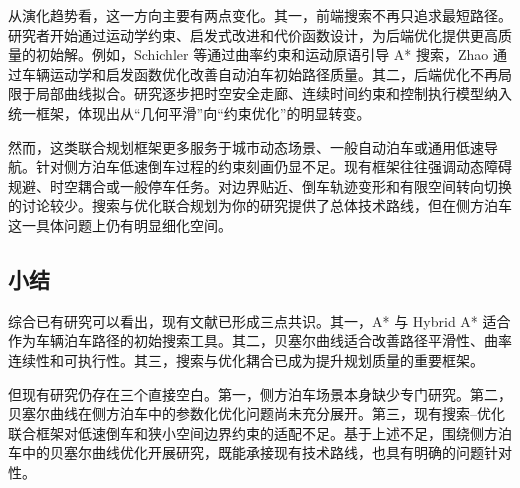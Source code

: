 从演化趋势看，这一方向主要有两点变化。其一，前端搜索不再只追求最短路径。研究者开始通过运动学约束、启发式改进和代价函数设计，为后端优化提供更高质量的初始解\cite{zhao2024automatedparkingbev,schichler2024smoothastar,li2025hybridastarjoint}。例如，Schichler 等通过曲率约束和运动原语引导 A* 搜索，Zhao 通过车辆运动学和启发函数优化改善自动泊车初始路径质量\cite{schichler2024smoothastar,zhao2024automatedparkingbev}。其二，后端优化不再局限于局部曲线拟合。研究逐步把时空安全走廊、连续时间约束和控制执行模型纳入统一框架，体现出从“几何平滑”向“约束优化”的明显转变\cite{deolasee2022spatiotemporalbezier,li2025hybridastarjoint}。

然而，这类联合规划框架更多服务于城市动态场景、一般自动泊车或通用低速导航\cite{yin2025avp,li2025hybridastarjoint,zhao2024automatedparkingbev}。针对侧方泊车低速倒车过程的约束刻画仍显不足。现有框架往往强调动态障碍规避、时空耦合或一般停车任务。对边界贴近、倒车轨迹变形和有限空间转向切换的讨论较少。搜索与优化联合规划为你的研究提供了总体技术路线，但在侧方泊车这一具体问题上仍有明显细化空间。

\subsection{小结}

综合已有研究可以看出，现有文献已形成三点共识。其一，A* 与 Hybrid A* 适合作为车辆泊车路径的初始搜索工具\cite{yin2025avp,wu2025agvparking,zhao2024automatedparkingbev}。其二，贝塞尔曲线适合改善路径平滑性、曲率连续性和可执行性\cite{zhu2025astarbezier,zhou2025quinticbezier,deolasee2022spatiotemporalbezier}。其三，搜索与优化耦合已成为提升规划质量的重要框架\cite{li2025hybridastarjoint,deolasee2022spatiotemporalbezier,zhao2024automatedparkingbev}。

但现有研究仍存在三个直接空白。第一，侧方泊车场景本身缺少专门研究。第二，贝塞尔曲线在侧方泊车中的参数化优化问题尚未充分展开。第三，现有搜索--优化联合框架对低速倒车和狭小空间边界约束的适配不足。基于上述不足，围绕侧方泊车中的贝塞尔曲线优化开展研究，既能承接现有技术路线，也具有明确的问题针对性。
